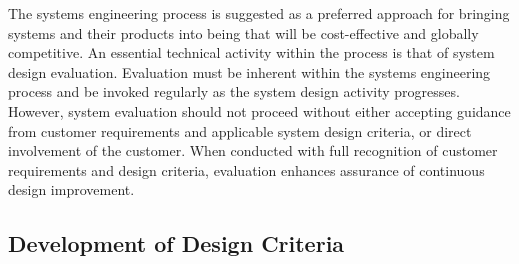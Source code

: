 The systems engineering process is suggested as a preferred approach for bringing systems and their products into being that will be cost-effective and globally competitive. An essential technical activity within the process is that of system design evaluation. Evaluation must be inherent within the systems engineering process and be invoked regularly as the system design activity progresses. However, system evaluation should not proceed without either accepting guidance from customer requirements and applicable system design criteria, or direct involvement of the customer. When conducted with full recognition of customer requirements and design criteria, evaluation enhances assurance of continuous design improvement.

\subsection{Development of Design Criteria}

